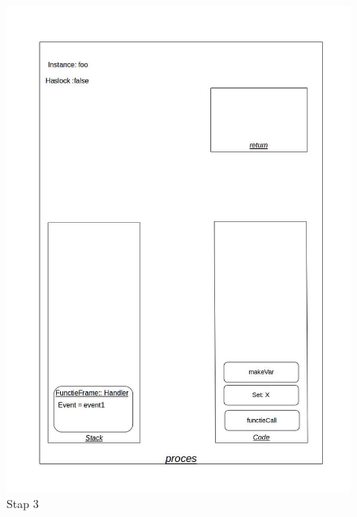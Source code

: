 \documentclass[]{article}
\begin{document}
\begin{figure}[H]
\centering
\includegraphics[scale=0.4]{AnalyseADTAlgorithm/processtappen/stap3.jpg}
\caption{Stap 3}
\end{figure}
\end{document}
